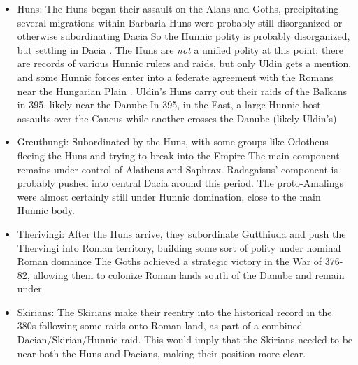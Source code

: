 \documentclass{article}
\begin{document}
	\begin{itemize}
		\item Huns:\newline
		The Huns began their assault on the Alans and Goths, precipitating several migrations within Barbaria\newline
		Huns were probably still disorganized or otherwise subordinating Dacia\newline
		So the Hunnic polity is probably disorganized, but settling in Dacia \cite{OttoHuns}.\newline
		The Huns are \textit{not} a unified polity at this point; there are records of various Hunnic rulers and raids, but only Uldin gets a mention, and some Hunnic forces enter into a federate agreement with the Romans near the Hungarian Plain \cite{OttoHuns}.\newline
		Uldin's Huns carry out their raids of the Balkans in 395, likely near the Danube\newline
		In 395, in the East, a large Hunnic host assaults over the Caucus while another crosses the Danube (likely Uldin's)
		
		\item Greuthungi:\newline
		Subordinated by the Huns, with some groups like Odotheus fleeing the Huns and trying to break into the Empire
		The main component remains under control of Alatheus and Saphrax. \newline
		Radagaisus' component is probably pushed into central Dacia around this period.\newline
		The proto-Amalings were almost certainly still under Hunnic domination, close to the main Hunnic body.
		
		\item Therivingi:\newline
		After the Huns arrive, they subordinate Gutthiuda and push the Thervingi into Roman territory, building some sort of polity under nominal Roman domaince
		The Goths achieved a strategic victory in the War of 376-82, allowing them to colonize Roman lands south of the Danube and remain under \cite{HeatherEmpiresAndBarbarians}\newline
		
		\item Skirians:\newline
		The Skirians make their reentry into the historical record in the 380s following some raids onto Roman land, as part of a combined Dacian/Skirian/Hunnic raid.\newline
		This would imply that the Skirians needed to be near both the Huns and Dacians, making their position more clear.
		

\end{itemize}
\end{document}
